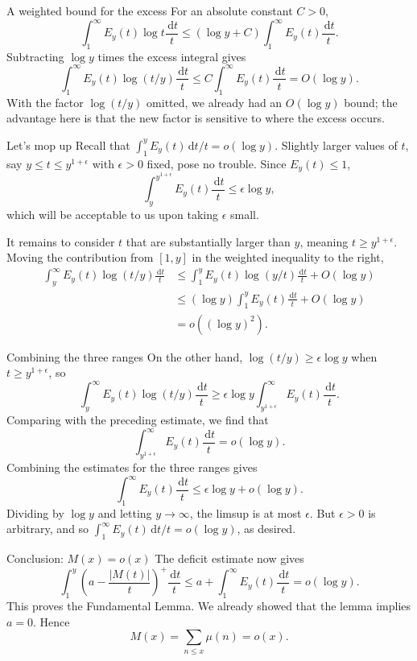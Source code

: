 \documentclass[aspectratio=169,11pt]{beamer}
\newcommand{\dd}{\,\mathrm d}
\begin{document}
\begin{frame}{A weighted bound for the excess}
For an absolute constant $C>0$,
\[\int_1^\infty E_y(t)\log t\frac{\dd t}t\le(\log y+C)\int_1^\infty E_y(t)\frac{\dd t}t.\]
Subtracting $\log y$ times the excess integral gives
\[\int_1^\infty E_y(t)\log(t/y)\frac{\dd t}t
\le C\int_1^\infty E_y(t)\frac{\dd t}t=O(\log y).\]
With the factor $\log(t/y)$ omitted, we already had an $O(\log y)$ bound; the advantage here is that the new factor is sensitive to where the excess occurs.
\end{frame}
\begin{frame}{Let's mop up}
\small
Recall that $\int_1^y E_y(t)\dd t/t=o(\log y)$. Slightly larger values of $t$, say $y\le t\le y^{1+\epsilon}$ with $\epsilon>0$ fixed, pose no trouble. Since $E_y(t)\le1$,
\[\int_y^{y^{1+\epsilon}}E_y(t)\frac{\dd t}t\le\epsilon\log y,\]
which will be acceptable to us upon taking $\epsilon$ small.

It remains to consider $t$ that are substantially larger than $y$, meaning $t\ge y^{1+\epsilon}$. Moving the contribution from $[1,y]$ in the weighted inequality to the right,
\begin{align*}
\int_y^\infty E_y(t)\log(t/y)\frac{\dd t}t
&\le\int_1^y E_y(t)\log(y/t)\frac{\dd t}t+O(\log y)\\
&\le(\log y)\int_1^y E_y(t)\frac{\dd t}t+O(\log y)\\
&=o((\log y)^2).
\end{align*}
\end{frame}
\begin{frame}{Combining the three ranges}
\small
On the other hand, $\log(t/y)\ge\epsilon\log y$ when $t\ge y^{1+\epsilon}$, so
\[\int_y^\infty E_y(t)\log(t/y)\frac{\dd t}t
\ge\epsilon\log y\int_{y^{1+\epsilon}}^\infty E_y(t)\frac{\dd t}t.\]
Comparing with the preceding estimate, we find that
\[\int_{y^{1+\epsilon}}^\infty E_y(t)\frac{\dd t}t=o(\log y).\]
Combining the estimates for the three ranges gives
\[\int_1^\infty E_y(t)\frac{\dd t}t\le\epsilon\log y+o(\log y).\]
Dividing by $\log y$ and letting $y\to\infty$, the limsup is at most $\epsilon$. But $\epsilon>0$ is arbitrary, and so $\int_1^\infty E_y(t)\dd t/t=o(\log y)$, as desired.
\end{frame}
\begin{frame}{Conclusion: $M(x)=o(x)$}
The deficit estimate now gives
\[\int_1^y\left(a-\frac{|M(t)|}t\right)^+\frac{\dd t}t
\le a+\int_1^\infty E_y(t)\frac{\dd t}t=o(\log y).\]
This proves the Fundamental Lemma. We already showed that the lemma implies $a=0$. Hence
\[\boxed{\displaystyle M(x)=\sum_{n\le x}\mu(n)=o(x).}\]
\end{frame}
\end{document}

